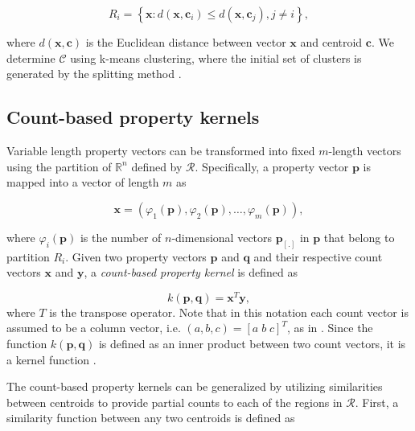 \[
R_{i}=\left\{ \mathbf{x}:d(\mathbf{x},\mathbf{c}_{i})\leq d(\mathbf{x},\mathbf{c}_{j}), j \neq i \right\} ,
\]

\noindent where $d(\mathbf{x},\mathbf{c})$ is the Euclidean distance between vector $\mathbf{x}$ and centroid $\mathbf{c}$. We determine $\mathcal{C}$ using k-means clustering, where the initial set of clusters is generated by the splitting method \citep{gersho1992vector}.


\subsection{Count-based property kernels}
\label{sec:propertykernels}

Variable length property vectors can be transformed into fixed $m$-length vectors using the partition of $\mathbb{R}^{n}$ defined by $\mathcal{R}$. Specifically, a property vector $\mathbf{p}$ is mapped into a vector of length $m$ as 

\[
\mathbf{x}=\left(\varphi_{1}(\mathbf{p}),\varphi_{2}(\mathbf{p}),\ldots,\varphi_{m}(\mathbf{p})\right),
\]

\noindent where $\varphi_{i}(\mathbf{p})$ is the number of $n$-dimensional vectors $\mathbf{p}_{[.]}$ in $\mathbf{p}$ that belong to partition $R_{i}$. Given two property vectors $\mathbf{p}$ and $\mathbf{q}$ and their respective count vectors $\mathbf{x}$ and $\mathbf{y}$, a \textit{count-based property kernel} is defined as

\[
k(\mathbf{p},\mathbf{q})=\mathbf{x}^{T}\mathbf{y},
\]
where $T$ is the transpose operator. Note that in this notation each count vector is assumed to be a column vector, i.e. $\left(a,b,c\right)=\left[a\; b\; c\right]^{T}$, as in \cite{strang2003introduction}. Since the function $k(\mathbf{p},\mathbf{q})$ is defined as an inner product between two count vectors, it is a kernel function \citep{Haussler1999}.


The count-based property kernels can be generalized by utilizing similarities between centroids to provide partial counts to each of the regions in $\mathcal{R}$. First, a similarity function between any two centroids is defined as 

